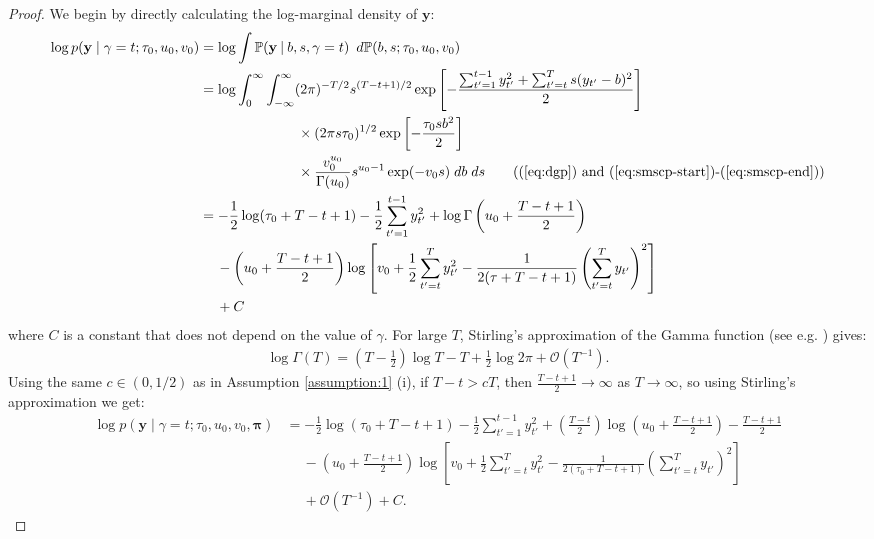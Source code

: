 \begin{proof} 
We begin by directly calculating the log-marginal density of $\mathbf{y}$: 
\begin{align*}
    \log p(\mathbf{y} \;|\; \gamma = t; \tau_0,u_0,v_0) &= \log \int \Pr(\mathbf{y} \:|\:b,s,\gamma = t) \:\; d\Pr(b,s;\tau_0, u_0, v_0) \\
    &= \log \int_{0}^\infty\int_{-\infty}^\infty (2\pi)^{-T/2} s^{(T-t+1)/2} \exp\left[-\frac{\sum_{t'=1}^{t-1} y_{t'}^2 + \sum_{t'=t}^{T} s(y_{t'} - b)^2}{2}\right]  \\
    &\quad\quad\quad\quad\quad\quad\quad  \times (2\pi s\tau_0)^{1/2}\exp\left[-\frac{\tau_0 s b^2}{2}\right] \\
    &\quad\quad\quad\quad\quad\quad\quad  \times\frac{v_0^{u_0}}{\Gamma(u_0)}s^{u_0- 1}\exp(-v_0 s) \; db\; ds \tag{(\ref{eq:dgp}) and (\ref{eq:smscp-start})-(\ref{eq:smscp-end})} \\
    &= -\frac{1}{2}\log(\tau_0 + T - t + 1) - \frac{1}{2}\sum_{t'=1}^{t-1} y_{t'}^2 + \log \Gamma\left(u_0 + \frac{T - t +1}{2}\right) \\
    &\quad\: - \left(u_0 + \frac{T - t +1}{2}\right)\log\left[v_0 +\frac{1}{2}\sum_{t'=t}^T y_{t'}^2 - \frac{1}{2(\tau + T- t +1)}\left(\sum_{t'=t}^T y_{t'}\right)^2 \right] \\
    &\quad\: + C
\end{align*}
where $C$ is a constant that does not depend on the value of $\gamma$. For large $T$, Stirling's approximation of the Gamma function (see e.g. \citealp{abramowitz68}) gives: 
\begin{align*}
    \log \Gamma(T) = \left(T - \frac{1}{2}\right) \log T - T + \frac{1}{2} \log 2 \pi + \mathcal{O}(T^{-1}).
\end{align*}
Using the same $c \in (0,1/2)$ as in Assumption \ref{assumption:1} (i), if $T-t > cT$, then $\frac{T-t+1}{2} \to \infty$ as $T \to \infty$, so using Stirling's approximation we get:
\small
\begin{align*}
    \log p(\mathbf{y} \;|\; \gamma = t; \tau_0,u_0,v_0, \pmb{\pi}) &= -\frac{1}{2}\log(\tau_0 + T - t + 1) - \frac{1}{2}\sum_{t'=1}^{t-1} y_{t'}^2  +\left(\frac{T-t}{2}\right) \log \left(u_0 + \frac{T-t+1}{2}\right) - \frac{T-t+1}{2}  \\
    &\quad\: - \left(u_0 + \frac{T - t +1}{2}\right)\log\left[v_0 +\frac{1}{2}\sum_{t'=t}^T y_{t'}^2 - \frac{1}{2(\tau_0 + T- t +1)}\left(\sum_{t'=t}^T y_{t'}\right)^2 \right] \\
    &\quad\:+ \mathcal{O}(T^{-1}) + C.
\end{align*}

\end{proof}
